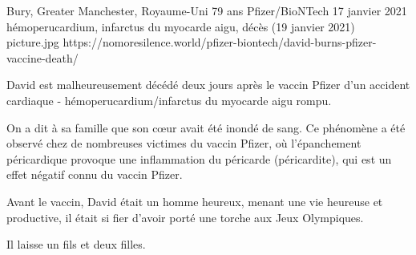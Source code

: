 {Bury, Greater Manchester, Royaume-Uni}
{79 ans}
{Pfizer/BioNTech}
{17 janvier 2021}
{hémoperucardium, infarctus du myocarde aigu, décès (19 janvier 2021)}
{picture.jpg}
{https://nomoresilence.world/pfizer-biontech/david-burns-pfizer-vaccine-death/}
{

David est malheureusement décédé deux jours après le vaccin Pfizer d'un accident
cardiaque - hémoperucardium/infarctus du myocarde aigu rompu.

On a dit à sa famille que son cœur avait été inondé de sang. Ce phénomène a été
observé chez de nombreuses victimes du vaccin Pfizer, où l'épanchement
péricardique provoque une inflammation du péricarde (péricardite), qui est un
effet négatif connu du vaccin Pfizer.

Avant le vaccin, David était un homme heureux, menant une vie heureuse et
productive, il était si fier d'avoir porté une torche aux Jeux Olympiques.

Il laisse un fils et deux filles.

}
